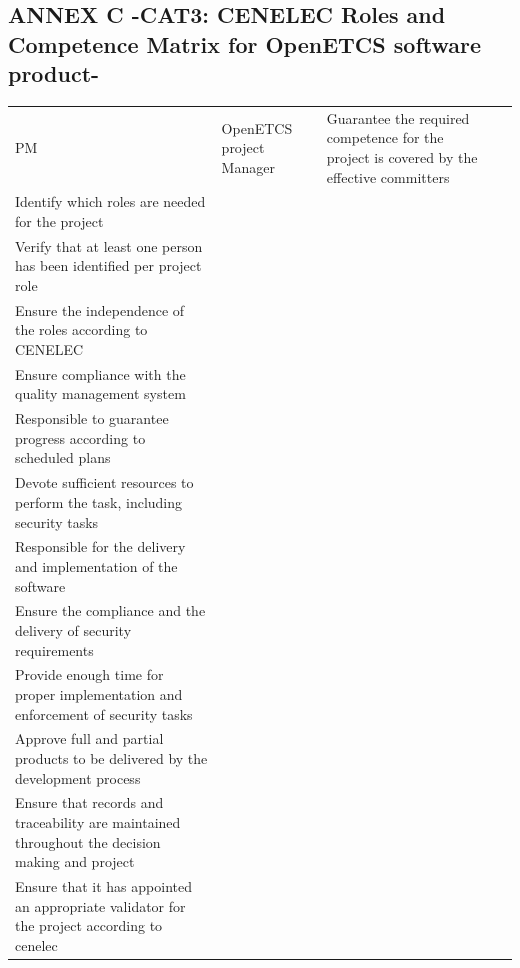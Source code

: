 \documentclass{template/openetcs_article}
\begin{document}
\begin{landscape}
\newpage
\subsection{ANNEX C -CAT3: CENELEC Roles and Competence Matrix for OpenETCS software product-}

\begin{flushleft}
\begin{supertabular}[H]{|m{1cm}|m{2,5cm}|m{15,5cm}|m{6cm}|}
\hline
PM &
OpenETCS project Manager &
\raggedright
Guarantee the required competence for the project is covered by the effective committers\\
Identify which roles are needed for the project\\
Verify that at least one person has been identified per project role\\
Ensure the independence of the roles according to CENELEC\\
Ensure compliance with the quality management system\\
Responsible to guarantee progress according to scheduled plans\\
Devote sufficient resources to perform the task, including security tasks\\
Responsible for the delivery and implementation of the software\\
Ensure the compliance and the delivery of security requirements\\
Provide enough time for proper implementation and enforcement of security tasks\\
Approve full and partial products to be delivered by the development process\\
Ensure that records and traceability are maintained throughout the decision making and project\\
Ensure that it has appointed an appropriate validator for the project according to cenelec

\end{supertabular}
\end{flushleft}
\end{landscape}
\end{document}
